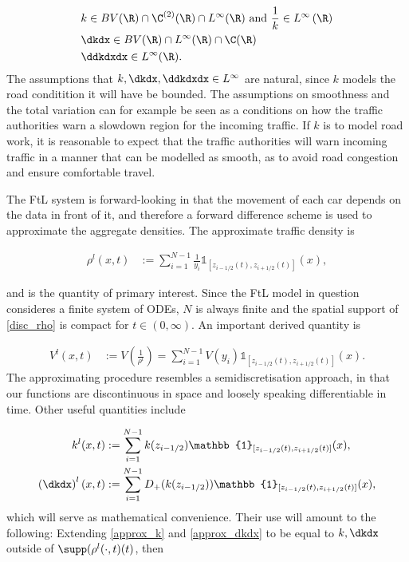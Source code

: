 \begin{align}
    &k \in BV(\R) \cap \C^{(2)}(\R) \cap L^\infty(\R) \text{ and } \frac{1}{k} \in L^\infty\left(\R\right) \label{assump_k1}\\
    &\dkdx \in BV(\R)\cap L^\infty(\R) \cap \C(\R) \label{assump_k2}\\
    &\ddkdxdx \in L^\infty(\R). \label{assump_k3}
\end{align}
The assumptions that $k, \dkdx, \ddkdxdx \in L^\infty$ are natural, since $k$ models the road conditition it will have be bounded. The assumptions on smoothness and the total variation can for example be seen as a conditions on how the traffic authorities warn a slowdown region for the incoming traffic. If $k$ is to model road work, it is reasonable to expect that the traffic authorities will warn incoming traffic in a manner that can be modelled as smooth, as to avoid road congestion and ensure comfortable travel. 

The FtL system is forward-looking in that the movement of each car depends on the data in front of it, and therefore a forward difference scheme is used to approximate the aggregate densities. The approximate traffic density is

\begin{align} \label{disc_rho}
    \rho^l(x,t) &:= \sum_{i = 1}^{N-1} \frac{1}{y_i}\mathbb{1}_{[z_{i - 1/2}(t), z_{i + 1/2}(t)]}(x),
\end{align}

and is the quantity of primary interest. Since the FtL model in question consideres a finite system of ODEs, $N$ is always finite and the spatial support of \eqref{disc_rho} is compact for $t \in (0,\infty)$. An important derived quantity is 

\begin{align} \label{disc_V}
    V^l(x,t) &:= V\left(\frac{1}{\rho^l}\right) = \sum_{i = 1}^{N-1} V(y_i)\mathbb{1}_{[z_{i - 1/2}(t), z_{i + 1/2}(t)]}(x). 
\end{align}
The approximating procedure resembles a semidiscretisation approach, in that our functions are discontinuous in space and loosely speaking differentiable in time. Other useful quantities include 

\begin{align} 
    k^l(x,t) &:= \sum_{i = 1}^{N-1} k(z_{i-1/2}) \mathbb{1}_{[z_{i - 1/2}(t), z_{i + 1/2}(t)]}(x), \label{approx_k}\\
    \left(\dkdx \right)^l(x,t) &:= \sum_{i = 1}^{N-1} D_+(k(z_{i-1/2})) \mathbb{1}_{[z_{i - 1/2}(t), z_{i + 1/2}(t)]}(x) \label{approx_dkdx}, \\
\end{align}
which will serve as mathematical convenience. Their use will amount to the following: Extending \eqref{approx_k} and \eqref{approx_dkdx} to be equal to $k, \dkdx$ outside of $\supp(\rho^l(\cdot,t)(t)$, then 

